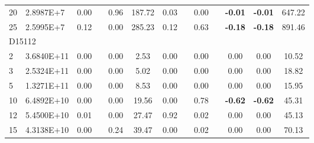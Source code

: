 {\begin{longtable}{@{}llccccccccccc@{}}
\multicolumn{1}{l|}{20} & \multicolumn{1}{l|}{2.8987E+7}  & 0.00 & \multicolumn{1}{c|}{}    & 0.96 & \multicolumn{1}{c|}{187.72}   & 0.03 & \multicolumn{1}{c|}{}    & 0.00 & \multicolumn{1}{c|}{}    & \textbf{-0.01}  & \textbf{-0.01}  & 647.22  \\
\multicolumn{1}{l|}{25} & \multicolumn{1}{l|}{2.5995E+7}  & 0.12 & \multicolumn{1}{c|}{}    & 0.00 & \multicolumn{1}{c|}{285.23}   & 0.12 & \multicolumn{1}{c|}{}    & 0.63 & \multicolumn{1}{c|}{}    & \textbf{-0.18}  & \textbf{-0.18}  & 891.46  \\ \hline
\multicolumn{13}{l}{D15112}                                                                                                                                                                                                                          \\ \hline
\multicolumn{1}{l|}{2}  & \multicolumn{1}{l|}{3.6840E+11} & 0.00 & \multicolumn{1}{c|}{}    & 0.00 & \multicolumn{1}{c|}{2.53}     & 0.00 & \multicolumn{1}{c|}{}    & 0.00 & \multicolumn{1}{c|}{}    & 0.00            & 0.00            & 10.52   \\
\multicolumn{1}{l|}{3}  & \multicolumn{1}{l|}{2.5324E+11} & 0.00 & \multicolumn{1}{c|}{}    & 0.00 & \multicolumn{1}{c|}{5.02}     & 0.00 & \multicolumn{1}{c|}{}    & 0.00 & \multicolumn{1}{c|}{}    & 0.00            & 0.00            & 18.82   \\
\multicolumn{1}{l|}{5}  & \multicolumn{1}{l|}{1.3271E+11} & 0.00 & \multicolumn{1}{c|}{}    & 0.00 & \multicolumn{1}{c|}{8.53}     & 0.00 & \multicolumn{1}{c|}{}    & 0.00 & \multicolumn{1}{c|}{}    & 0.00            & 0.00            & 15.95   \\
\multicolumn{1}{l|}{10} & \multicolumn{1}{l|}{6.4892E+10} & 0.00 & \multicolumn{1}{c|}{}    & 0.00 & \multicolumn{1}{c|}{19.56}    & 0.00 & \multicolumn{1}{c|}{}    & 0.78 & \multicolumn{1}{c|}{}    & \textbf{-0.62}  & \textbf{-0.62}  & 45.31   \\
\multicolumn{1}{l|}{12} & \multicolumn{1}{l|}{5.4500E+10} & 0.01 & \multicolumn{1}{c|}{}    & 0.00 & \multicolumn{1}{c|}{27.47}    & 0.92 & \multicolumn{1}{c|}{}    & 0.02 & \multicolumn{1}{c|}{}    & 0.00            & 0.00            & 45.13   \\
\multicolumn{1}{l|}{15} & \multicolumn{1}{l|}{4.3138E+10} & 0.00 & \multicolumn{1}{c|}{}    & 0.24 & \multicolumn{1}{c|}{39.47}    & 0.00 & \multicolumn{1}{c|}{}    & 0.02 & \multicolumn{1}{c|}{}    & 0.00            & 0.00            & 70.13   \\

\end{longtable}}
